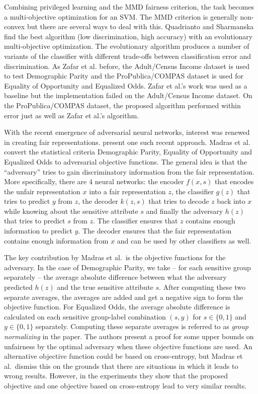 Combining privileged learning and the MMD fairness criterion, the task becomes a
multi-objective optimization for an SVM. The MMD criterion is generally non-convex but
there are several ways to deal with this. Quadrianto and Sharmanska find the best
algorithm (low discrimination, high accuracy) with an evolutionary multi-objective
optimization. The evolutionary algorithm produces a number of variants of the classifier
with different trade-offs between classification error and discrimination. As Zafar et al.
before, the Adult/Census Income dataset is used to test Demographic Parity and the
ProPublica/COMPAS dataset is used for Equality of Opportunity and Equalized Odds. Zafar et
al.'s work was used as a baseline but the implementation failed on the Adult/Census Income
dataset. On the ProPublica/COMPAS dataset, the proposed algorithm performed within error
just as well as Zafar et al.'s algorithm.

With the recent emergence of adversarial neural networks, interest was renewed in creating
fair representations. \citet{madras2018learning} present one such recent
approach.
Madras et al.  convert the statistical criteria Demographic Parity, Equality of Opportunity and Equalized
Odds to adversarial objective functions. The general idea is that the ``adversary'' tries
to gain discriminatory information from the fair representation. More specifically, there
are 4 neural networks: the encoder \(f(x, s)\) that encodes the unfair representation \(x\)
into a fair representation \(z\), the classifier \(g(z)\) that tries to predict \(y\) from \(z\),
the decoder \(k(z, s)\) that tries to decode \(z\) back into \(x\) while knowing about the
sensitive attribute \(s\) and finally the adversary \(h(z)\) that tries to predict \(s\) from
\(z\). The classifier ensures that \(z\) contains enough information to predict \(y\). The
decoder ensures that the fair representation contains enough information from \(x\) and can
be used by other classifiers as well.

The key contribution by Madras et al.~is the objective functions for the adversary. In the
case of Demographic Parity, we take -- for each sensitive group separately -- the average
absolute difference between what the adversary predicted \(h(z)\) and the true sensitive
attribute \(s\). After computing these two separate averages, the averages are added and get
a negative sign to form the objective function. For Equalized Odds, the average absolute
difference is calculated on each sensitive group-label combination \((s, y)\) for \(s \in \{0, 1\}\) and \(y \in \{0, 1\}\) separately. Computing these separate averages is referred
to as \emph{group normalizing} in the paper. The authors present a proof for some upper bounds
on unfairness by the optimal adversary when these objective functions are used. An
alternative objective function could be based on cross-entropy, but Madras et al.~dismiss
this on the grounds that there are situations in which it leads to wrong results. However,
in the experiments they show that the proposed objective and one objective based on
cross-entropy lead to very similar results.

